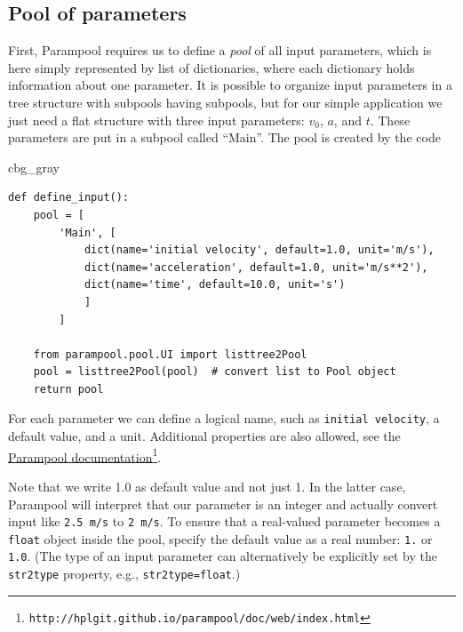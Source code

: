 \documentclass[graybox,envcountchap,sectrefs,final]{svmonodo}
\newenvironment{_cod_tight}[1]{
   \def\FrameCommand{\colorbox{#1}}
   \FrameRule0.6pt\MakeFramed {\FrameRestore}\vskip3mm}
   {\vskip0mm\endMakeFramed}
\newenvironment{cod}[1]{
\bgroup\rmfamily
\fboxsep=0mm\relax
\begin{_cod_tight}{#1}
\list{}{\parsep=-2mm\parskip=0mm\topsep=0pt\leftmargin=2mm
\rightmargin=2\leftmargin\leftmargin=4pt\relax}
\item\relax}
{\endlist\end{_cod_tight}\egroup}
\newenvironment{notice_mdfboxadmon}[1][]{
\begin{notice_mdfboxmdframed}[frametitle=#1]
}
{
\end{notice_mdfboxmdframed}
}
\begin{document}
\subsection{Pool of parameters}

First, Parampool requires us to define a \emph{pool} of all input
parameters, which is here simply represented by list of dictionaries, where each
dictionary holds information about one parameter. It is possible to
organize input parameters in a tree structure with subpools having
subpools,
but for our simple application we just need a flat structure with
three input parameters:
$v_0$, $a$, and $t$. These parameters are put in a subpool called
``Main''. The pool is created by the code

\begin{cod}{cbg_gray}\begin{Verbatim}[numbers=none,fontsize=\fontsize{9pt}{9pt},baselinestretch=0.95,xleftmargin=2mm]
def define_input():
    pool = [
        'Main', [
            dict(name='initial velocity', default=1.0, unit='m/s'),
            dict(name='acceleration', default=1.0, unit='m/s**2'),
            dict(name='time', default=10.0, unit='s')
            ]
        ]

    from parampool.pool.UI import listtree2Pool
    pool = listtree2Pool(pool)  # convert list to Pool object
    return pool
\end{Verbatim}
\end{cod}
\noindent
For each parameter we can define a logical name, such as \texttt{initial velocity},
a default value, and a unit. Additional properties
are also allowed, see the \href{{http://hplgit.github.io/parampool/doc/web/index.html}}{Parampool documentation}\footnote{\texttt{http://hplgit.github.io/parampool/doc/web/index.html}}.


\begin{notice_mdfboxadmon}
Note that we write 1.0 as default value and not just 1.
In the latter case, Parampool will interpret that our parameter is
an integer and actually convert input like \texttt{2.5 m/s} to \texttt{2 m/s}.
To ensure that a real-valued parameter becomes a \texttt{float} object inside
the pool, specify the default value as a real number: \texttt{1.} or \texttt{1.0}.
(The type of an input parameter can alternatively be explicitly set by
the \texttt{str2type} property, e.g., \texttt{str2type=float}.)
\end{notice_mdfboxadmon}
\end{document}
